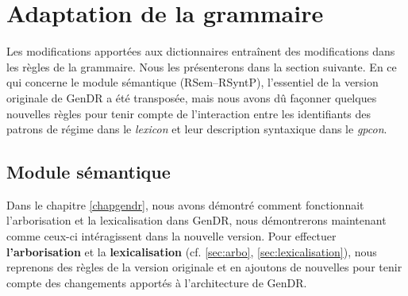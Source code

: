 \section{Adaptation de la grammaire}

Les modifications apportées aux dictionnaires entraînent des modifications dans les règles de la grammaire. Nous les présenterons dans la section suivante. En ce qui concerne le module sémantique (\ac{RSem}--\ac{RSyntP}), l'essentiel de la version originale de GenDR a été transposée, mais nous avons dû façonner quelques nouvelles règles pour tenir compte de l'interaction entre les identifiants des patrons de régime dans le \emph{lexicon} et leur description syntaxique dans le \emph{gpcon}.

\subsection{Module sémantique}

Dans le chapitre \ref{chapgendr}, nous avons démontré comment fonctionnait l'arborisation et la lexicalisation dans GenDR, nous démontrerons maintenant comme ceux-ci intéragissent dans la nouvelle version. Pour effectuer \textbf{l'arborisation} et la \textbf{lexicalisation} (cf. \ref{sec:arbo}, \ref{sec:lexicalisation}), nous reprenons des règles de la version originale et en ajoutons de nouvelles pour tenir compte des changements apportés à l'architecture de GenDR. 

